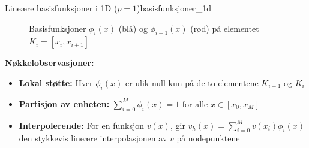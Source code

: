 \documentclass[../main.tex]{subfiles}
\begin{document}
\begin{example}{Lineære basisfunksjoner i 1D ($p=1$)}{basisfunksjoner_1d}
    \begin{figure}[H]
        \centering
        \caption{Basisfunksjoner $\phi_i(x)$ (blå) og $\phi_{i+1}(x)$ (rød) på elementet $K_i = [x_i, x_{i+1}]$}
        \label{fig:basis_function_element}
    \end{figure}

    \textbf{Nøkkelobservasjoner:}
    \begin{itemize}
        \item \textbf{Lokal støtte:} Hver $\phi_i(x)$ er ulik null kun på de to elementene $K_{i-1}$ og $K_i$
        \item \textbf{Partisjon av enheten:} $\sum_{i=0}^{M} \phi_i(x) = 1$ for alle $x \in [x_0, x_{M}]$
        \item \textbf{Interpolerende:} For en funksjon $v(x)$, gir $v_h(x) = \sum_{i=0}^M v(x_i) \phi_i(x)$ den stykkevis lineære interpolasjonen av $v$ på nodepunktene
    \end{itemize}
\end{example}
\end{document}
